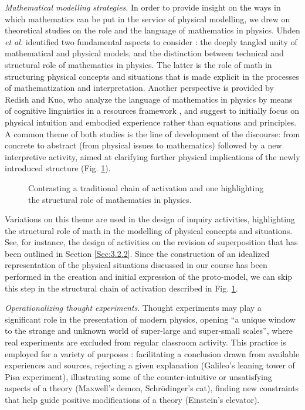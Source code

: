 \documentclass[twocolumn,secnumarabic,amssymb, nobibnotes, aps, prd, nofootinbib]{revtex4-2}
\begin{document}
\emph{Mathematical modelling strategies}. In order to provide insight on the ways in which mathematics can be put in the service of physical modelling, we drew on theoretical studies on the role and the language of mathematics in physics. Uhden \textit{et al.} identified two fundamental aspects to consider \cite{Uhden2012}: the deeply tangled unity of mathematical and physical models, and the distinction between technical and structural role of mathematics in physics. The latter is the role of math in structuring physical concepts and situations that is made explicit in the processes of mathematization and interpretation. Another perspective is provided by Redish and Kuo, who analyze the language of mathematics in physics by means of cognitive linguistics in a resources framework \cite{Redish2015}, and suggest to initially focus on physical intuition and embodied experience rather than equations and principles. A common theme of both studies is the line of development of the discourse: from concrete to abstract (from physical issues to mathematics) followed by a new interpretive activity, aimed at clarifying further physical implications of the newly introduced structure (Fig. \ref{FIG:6}).
\begin{figure}[!htpb]
    \caption{Contrasting a traditional chain of activation and one highlighting the structural role of mathematics in physics.}
    \label{FIG:6}
\end{figure}
Variations on this theme are used in the design of inquiry activities, highlighting the structural role of math in the modelling of physical concepts and situations. See, for instance, the design of activities on the revision of superposition that has been outlined in Section \ref{Sec:3.2.2}. Since the construction of an idealized representation of the physical situations discussed in our course has been performed in the creation and initial expression of the proto-model, we can skip this step in the structural chain of activation described in Fig. \ref{FIG:6}.

\emph{Operationalizing thought experiments}. Thought experiments may play a significant role in the presentation of modern physics, opening ``a unique window to the strange and unknown world of super-large and super-small scales''\cite{Galili2007}, where real experiments are excluded from regular classroom activity. This practice is employed for a variety of purposes \cite{Brown1991}: facilitating a conclusion drawn from available experiences and sources, rejecting a given explanation (Galileo's leaning tower of Pisa experiment), illustrating some of the counter-intuitive or unsatisfying aspects of a theory (Maxwell's demon, Schr\"{o}dinger's cat), finding new constraints that help guide positive modifications of a theory (Einstein's elevator).
\end{document}
